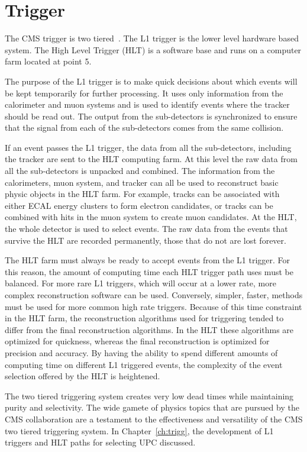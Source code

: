   \section{\label{sec:detTrg}Trigger}
    The CMS trigger is two tiered~\cite{Dasu:2000ge,Sphicas:2002gg}. 
    The L1 trigger is the lower level hardware based system. 
    The High Level Trigger (HLT) is a software base and runs on a computer farm
      located at point 5.

    The purpose of the L1 trigger is to make quick decisions about which events
      will be kept temporarily for further processing.
    It uses only information from the calorimeter and muon systems and is used
      to identify events where the tracker should be read out.
    The output from the sub-detectors is synchronized to ensure that the signal
      from each of the sub-detectors comes from the same collision. 

    If an event passes the L1 trigger, the data from all the sub-detectors,
      including the tracker are sent to the HLT computing farm. 
    At this level the raw data from all the sub-detectors is unpacked and 
      combined.
    The information from the calorimeters, muon system, and tracker can all 
      be used to reconstruct basic physic objects in the HLT farm. 
    For example, tracks can be associated with either ECAL energy clusters to 
      form electron candidates, or tracks can be combined with hits in the muon
      system to create muon candidates.
    At the HLT, the whole detector is used to select events.
    The raw data from the events that survive the HLT are recorded permanently,
      those that do not are lost forever. 

    The HLT farm must always be ready to accept events from the L1 trigger.
    For this reason, the amount of computing time each HLT trigger path uses
      must be balanced.
    For more rare L1 triggers, which will occur at a lower rate, more 
      complex reconstruction software can be used.
    Conversely, simpler, faster, methods must be used for more common high
      rate triggers. 
    Because of this time constraint in the HLT farm, the reconstruction 
      algorithms used for triggering tended to differ from the final 
      reconstruction algorithms.
    In the HLT these algorithms are optimized for quickness, whereas the final 
      reconstruction is optimized for precision and accuracy.
    By having the ability to spend different amounts of computing time on 
      different L1 triggered events, the complexity of the event selection 
      offered by the HLT is heightened. 

    The two tiered triggering system creates very low dead times while 
      maintaining purity and selectivity.
    The wide gamete of physics topics that are pursued by the CMS collaboration
      are a testament to the effectiveness and versatility of the CMS two 
      tiered triggering system.
    In Chapter~\ref{ch:trigg}, the development of L1 triggers and HLT paths 
      for selecting UPC \DIFdelbegin {}\DIFdelend \DIFaddbegin {}\DIFaddend discussed. 

